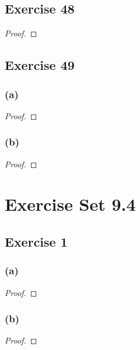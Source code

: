 \documentclass[14pt]{extarticle}
\begin{document}
\subsection{Exercise 48}

\begin{proof}

\end{proof}

\subsection{Exercise 49}

\subsubsection{(a)}

\begin{proof}

\end{proof}

\subsubsection{(b)}

\begin{proof}

\end{proof}

\section{Exercise Set 9.4}

\subsection{Exercise 1}

\subsubsection{(a)}

\begin{proof}

\end{proof}

\subsubsection{(b)}

\begin{proof}

\end{proof}
\end{document}
